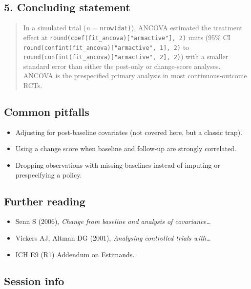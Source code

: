\documentclass[
]{article}
\providecommand{\tightlist}{%
  \setlength{\itemsep}{0pt}\setlength{\parskip}{0pt}}
\begin{document}
\subsection{5. Concluding statement}\label{concluding-statement}

\begin{quote}
In a simulated trial (\emph{n} = \texttt{nrow(dat)}), ANCOVA estimated
the treatment effect at
\texttt{round(coef(fit\_ancova){[}"armactive"{]},\ 2)} units (95\% CI
\texttt{round(confint(fit\_ancova){[}"armactive",\ 1{]},\ 2)} to
\texttt{round(confint(fit\_ancova){[}"armactive",\ 2{]},\ 2)}) with a
smaller standard error than either the post-only or change-score
analyses. ANCOVA is the prespecified primary analysis in most
continuous-outcome RCTs.
\end{quote}

\subsection{Common pitfalls}\label{common-pitfalls}

\begin{itemize}
\tightlist
\item
  Adjusting for post-baseline covariates (not covered here, but a
  classic trap).
\item
  Using a change score when baseline and follow-up are strongly
  correlated.
\item
  Dropping observations with missing baselines instead of imputing or
  prespecifying a policy.
\end{itemize}

\subsection{Further reading}\label{further-reading}

\begin{itemize}
\tightlist
\item
  Senn S (2006), \emph{Change from baseline and analysis of
  covariance\ldots{}}
\item
  Vickers AJ, Altman DG (2001), \emph{Analysing controlled trials
  with\ldots{}}
\item
  ICH E9 (R1) Addendum on Estimands.
\end{itemize}

\subsection{Session info}\label{session-info}
\end{document}
